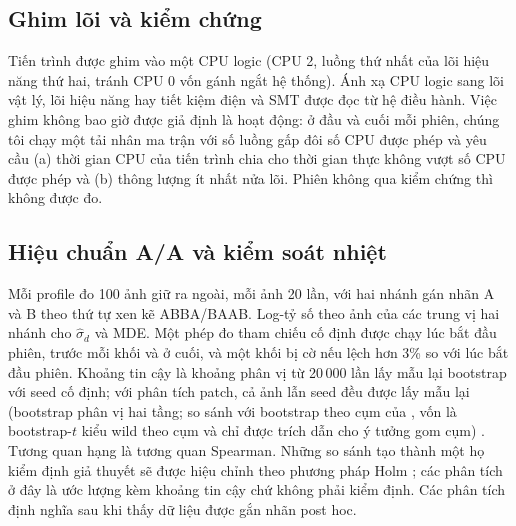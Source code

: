 \documentclass[12pt,a4paper]{article}
\begin{document}
\subsection{Ghim lõi và kiểm chứng}
Tiến trình được ghim vào một CPU logic (CPU 2, luồng thứ nhất của lõi hiệu năng thứ hai, tránh CPU 0 vốn gánh ngắt hệ thống). Ánh xạ CPU logic sang lõi vật lý, lõi hiệu năng hay tiết kiệm điện và SMT được đọc từ hệ điều hành. Việc ghim không bao giờ được giả định là hoạt động: ở đầu và cuối mỗi phiên, chúng tôi chạy một tải nhân ma trận với số luồng gấp đôi số CPU được phép và yêu cầu (a) thời gian CPU của tiến trình chia cho thời gian thực không vượt số CPU được phép và (b) thông lượng ít nhất nửa lõi. Phiên không qua kiểm chứng thì không được đo.

\subsection{Hiệu chuẩn A/A và kiểm soát nhiệt}
Mỗi profile đo 100 ảnh giữ ra ngoài, mỗi ảnh 20 lần, với hai nhánh gán nhãn A và B theo thứ tự xen kẽ ABBA/BAAB. Log-tỷ số theo ảnh của các trung vị hai nhánh cho $\hat\sigma_d$ và MDE. Một phép đo tham chiếu cố định được chạy lúc bắt đầu phiên, trước mỗi khối và ở cuối, và một khối bị cờ nếu lệch hơn 3\% so với lúc bắt đầu phiên. Khoảng tin cậy là khoảng phân vị từ 20\,000 lần lấy mẫu lại bootstrap với seed cố định; với phân tích patch, cả ảnh lẫn seed đều được lấy mẫu lại (bootstrap phân vị hai tầng; so sánh với bootstrap theo cụm của \cite{cameron2008cluster}, vốn là bootstrap-$t$ kiểu wild theo cụm và chỉ được trích dẫn cho ý tưởng gom cụm) \cite{efron1979bootstrap}. Tương quan hạng là tương quan Spearman. Những so sánh tạo thành một họ kiểm định giả thuyết sẽ được hiệu chỉnh theo phương pháp Holm \cite{holm1979}; các phân tích ở đây là ước lượng kèm khoảng tin cậy chứ không phải kiểm định. Các phân tích định nghĩa sau khi thấy dữ liệu được gắn nhãn post hoc.
\end{document}
